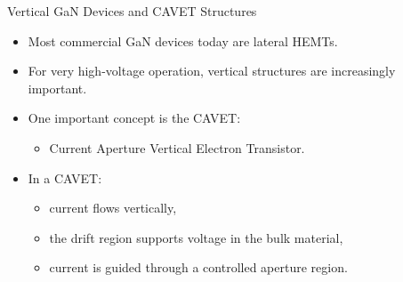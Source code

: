 \begin{frame}{Vertical GaN Devices and CAVET Structures}

\begin{itemize}
    \item Most commercial GaN devices today are lateral HEMTs.
    
    \item For very high-voltage operation, vertical structures are increasingly important.
    
    \item One important concept is the CAVET:
    \begin{itemize}
        \item Current Aperture Vertical Electron Transistor.
    \end{itemize}

    \item In a CAVET:
    \begin{itemize}
        \item current flows vertically,
        \item the drift region supports voltage in the bulk material,
        \item current is guided through a controlled aperture region.
    \end{itemize}
\end{itemize}


\end{frame}


